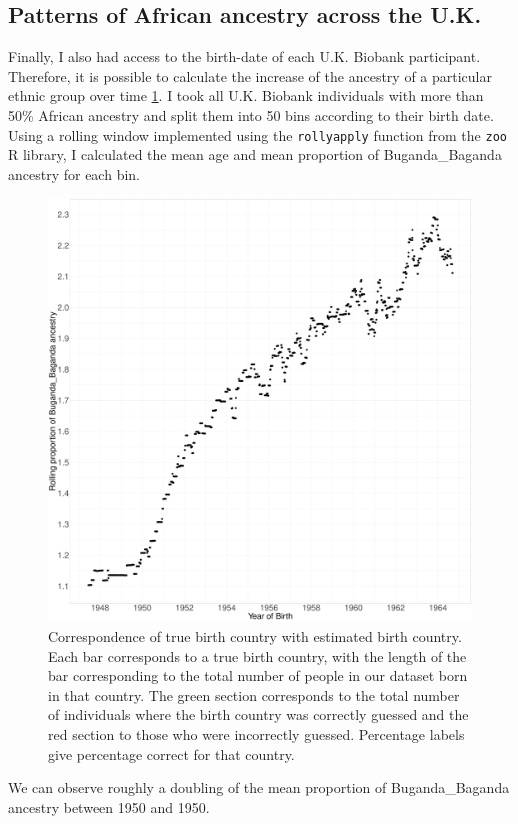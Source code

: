 \subsection{Patterns of African ancestry across the U.K.}

Finally, I also had access to the birth-date of each U.K. Biobank participant. Therefore, it is possible to calculate the increase of the ancestry of a particular ethnic group over time \ref{fig:rollingaverage_time_Buganda_ancestry}. I took all U.K. Biobank individuals with more than 50\% African ancestry and split them into 50 bins according to their birth date. Using a rolling window implemented using the \texttt{rollyapply} function from the \texttt{zoo} R library, I calculated the mean age and mean proportion of Buganda\_Baganda ancestry for each bin. 

\begin{figure}[htp]
    \centering
    \includegraphics[width=1.0\textwidth]{../images/chapter3/rollingaverage_time_Buganda_ancestry.pdf}
    \caption{Correspondence of true birth country with estimated birth country. Each bar corresponds to a true birth country, with the length of the bar corresponding to the total number of people in our dataset born in that country. The green section corresponds to the total number of individuals where the birth country was correctly guessed and the red section to those who were incorrectly guessed. Percentage labels give percentage correct for that country.}
    \label{fig:rollingaverage_time_Buganda_ancestry}
\end{figure}

We can observe roughly a doubling of the mean proportion of  Buganda\_Baganda ancestry between 1950 and 1950. 
